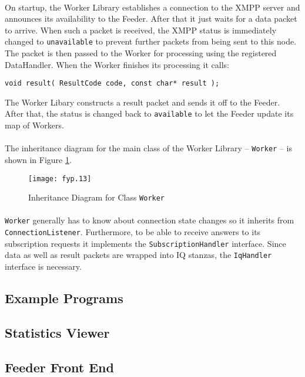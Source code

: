\paragraph{}
On startup, the Worker Library establishes a connection to the XMPP server and announces its availability to the Feeder. After that it just waits for a data packet to arrive. When such a packet is received, the XMPP status is immediately changed to \texttt{unavailable} to prevent further packets from being sent to this node. The packet is then passed to the Worker for processing using the registered DataHandler. When the Worker finishes its processing it calls:
\begin{flushleft}
\texttt{void result( ResultCode code, const char* result );}
\end{flushleft}
The Worker Libary constructs a result packet and sends it off to the Feeder. After that, the status is changed back to \texttt{available} to let the Feeder update its map of Workers.

\paragraph{}
The inheritance diagram for the main class of the Worker Library -- \texttt{Worker} -- is shown in Figure \ref{fig:inhworker}.

\begin{figure}[H]
\begin{center}
\texttt{[image: fyp.13]}
\end{center}
\caption{Inheritance Diagram for Class \texttt{Worker}}
\label{fig:inhworker}
\end{figure}

\paragraph{}
\texttt{Worker} generally has to know about connection state changes so it inherits from \texttt{ConnectionListener}. Furthermore, to be able to receive answers to its subscription requests it implements the \texttt{SubscriptionHandler} interface. Since data as well as result packets are wrapped into IQ stanzas, the \texttt{IqHandler} interface is necessary.


\subsection{Example Programs}
\paragraph{}

\subsection{Statistics Viewer}
\paragraph{}

\subsection{Feeder Front End}
\paragraph{}
